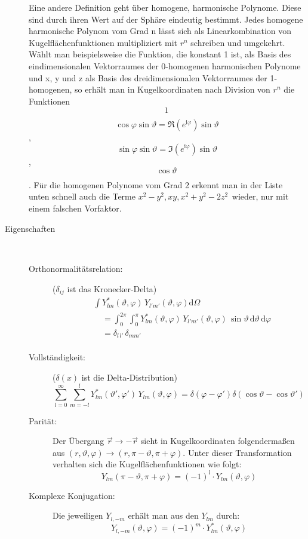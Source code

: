 \begin{definition}
\begin{description}
Eine andere Definition geht über homogene, harmonische Polynome. Diese sind durch ihren Wert auf der Sphäre eindeutig bestimmt. Jedes homogene harmonische Polynom vom Grad n lässt sich als Linearkombination von Kugelflächenfunktionen multipliziert mit $ r^n$ schreiben und umgekehrt. Wählt man beispielsweise die Funktion, die konstant 1 ist, als Basis des eindimensionalen Vektorraumes der 0-homogenen harmonischen Polynome und x, y und z als Basis des dreidimensionalen Vektorraumes der 1-homogenen, so erhält man in Kugelkoordinaten nach Division von $ r^n $  die Funktionen
\[1 \frac{}{}\]
\[ \cos{\varphi} \sin \vartheta = \Re{(e^{\mathrm i\varphi})} \sin \vartheta \],
\[\sin \varphi \sin \vartheta = \Im{(e^{\mathrm i\varphi})} \sin \vartheta \],
\[\cos \vartheta \frac{}{}\].
Für die homogenen Polynome vom Grad 2 erkennt man in der Liste unten schnell auch die Terme $ x^2-y^2, xy, x^2+y^2-2 z^2\frac{}{} $ wieder, nur mit einem falschen Vorfaktor.

	\item[Eigenschaften]\hspace{1cm} \\
	\begin{description}
		\item[Orthonormalitätsrelation:] ($\delta_{ij}$ ist das Kronecker-Delta)
\[\begin{align}
	&\int Y_{lm}^{*}(\vartheta,\varphi) \, Y_{l'm'}(\vartheta,\varphi) \mathrm d\Omega \\
	&\quad = \int_{0}^{2\pi} \int_{0}^{\pi} Y_{lm}^{*}(\vartheta,\varphi) \, Y_{l'm'}(\vartheta,\varphi)
	\, \sin{\vartheta} \, \mathrm d\vartheta \,\mathrm d\varphi \\
	&\quad = \delta_{l\,l'} \, \delta_{mm'}\\
\end{align}\]
	\item[Vollständigkeit:] ($\delta(x)$ ist die Delta-Distribution)
\[\sum_{l=0}^{\infty}\sum_{m=-l}^{l}Y_{lm}^{*}(\vartheta ',\varphi ') \, Y_{lm}(\vartheta,\varphi) = \delta(\varphi-\varphi ')\delta(\cos{\vartheta} -\cos{\vartheta '})\]
	\item[Parität:] Der Übergang $\vec r \rightarrow -\vec r$ sieht in Kugelkoordinaten folgendermaßen aus $(r,\vartheta,\varphi) \rightarrow (r,\pi-\vartheta,\pi+\varphi)$. Unter dieser Transformation verhalten sich die Kugelflächenfunktionen wie folgt:
\[Y_{lm}(\pi-\vartheta,\pi+\varphi)=(-1)^l\cdot Y_{lm}(\vartheta,\varphi)\]
	\item[Komplexe Konjugation:] Die jeweiligen $Y_{l,-m}$ erhält man aus den $Y_{lm}$ durch:
\[Y_{l,-m}(\vartheta,\varphi)=(-1)^m\cdot Y_{lm}^*(\vartheta,\varphi)\]
\end{description}
\end{description}
\end{definition}

